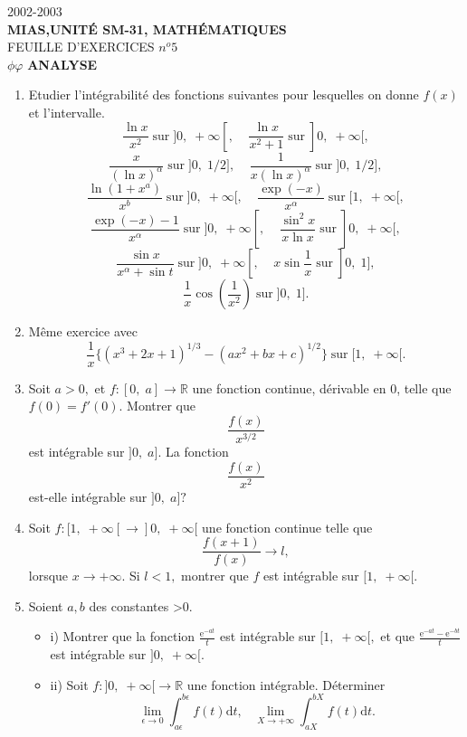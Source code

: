 \documentclass[12pt,a4paper]{article}
\begin{document}
\begin{center}
2002-2003\\
{\bf MIAS,UNITÉ SM-31, MATHÉMATIQUES}\\
\vspace{2mm}
 FEUILLE D'EXERCICES $n^o 5$\\
\vspace{1cm}
$\phi \varphi$
{\bf ANALYSE}
\end{center}
\begin{enumerate}
\item Etudier l'intégrabilité des fonctions suivantes pour lesquelles
  on donne $f(x)$ et l'intervalle.
$$\frac{\ln x}{x^2}\;\mbox{sur}\;]0,\;+\infty [,\;\;\;\;\frac{\ln
  x}{x^2+1}\;\mbox{sur}\;]0,\;+\infty [,$$
$$\frac{x}{(\ln x)^\alpha}\;\mbox{sur}\;]0,\;1/2
 ],\;\;\;\;\frac{1}{x(\ln x)^\alpha}\;\mbox{sur}\;]0,\;1/2 ],$$
$$\frac{\ln (1+x^a)}{x^b}\;\mbox{sur}\;]0,\;+\infty [,\;\;\;\;\frac{\exp
 (-x)}{x^\alpha}\;\mbox{sur}\;[1,\;+\infty [,$$
$$\frac{\exp (-x)-1}{x^\alpha}\;\mbox{sur}\;]0,\;+\infty [,\;\;\;\;\frac{\sin^2
  x}{x\ln x}\;\mbox{sur}\;]0,\;+\infty [,$$
$$\frac{\sin x}{x^\alpha+\sin t}\;\mbox{sur}\;]0,\;+\infty
[,\;\;\;\;x\sin\frac{1}{x}\;\mbox{sur}\;]0,\;1],$$
$$\frac{1}{x}\cos(\frac{1}{x^2})\;\mbox{sur}\;]0,\;1].$$
\item Même exercice avec 
$$\frac{1}{x}\{ (x^3+2x+1)^{1/3}-(ax^2+bx+c)^{1/2}\}\; \mbox{sur}\;
[1,\;+\infty [.$$
\item Soit $a>0,$ et $f:[0,\; a]\rightarrow\mathbb R$ une fonction
  continue, dérivable en 0, telle que $f(0)=f'(0).$ Montrer que
  $$\frac{f(x)}{x^{3/2}}$$ est intégrable sur $]0,\; a].$ La fonction
  $$\frac{f(x)}{x^2}$$ est-elle intégrable sur $]0,\; a] ?$  
\item Soit $f: [1,\;+\infty [\rightarrow ]0,\;+\infty [$ une fonction
  continue telle que $$\frac{f(x+1)}{f(x)}\rightarrow l,$$ lorsque
  $x\rightarrow +\infty.$ Si $l<1,$ montrer que $f$ est intégrable sur $[1,\;+\infty [.$
\item Soient $a, b$ des constantes >0.
\begin{itemize}
\item i) Montrer que la fonction $\frac{\mbox{e}^{-at}}{t}$ est
  intégrable sur $[1, \; +\infty [,$ et que
  $\frac{\mbox{e}^{-at}-\mbox{e}^{-bt}}{t}$ est intégrable sur $]0,\;
  +\infty [.$
\item ii) Soit $f :]0, \; +\infty [\rightarrow\mathbb R$ une fonction
  intégrable. Déterminer $$\lim_{\epsilon\rightarrow
    0}\int_{a\epsilon}^{b\epsilon}f(t)\mbox{d}t,\;\;\;\lim_
  { X\rightarrow +\infty}\int_{aX}^{bX}f(t)\mbox{d}t.$$

\end{itemize}
\end{enumerate}
\end{document}

